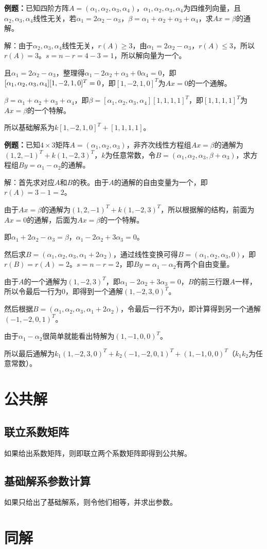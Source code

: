 \documentclass[UTF8, 12pt]{ctexart}
\begin{document}
\textbf{例题：}已知四阶方阵$A=(\alpha_1,\alpha_2,\alpha_3,\alpha_4)$，$\alpha_1,\alpha_2,\alpha_3,\alpha_4$为四维列向量，且$\alpha_2,\alpha_3,\alpha_4$线性无关，若$\alpha_1=2\alpha_2-\alpha_3$，$\beta=\alpha_1+\alpha_2+\alpha_3+\alpha_4$，求$Ax=\beta$的通解。

解：由于$\alpha_2,\alpha_3,\alpha_4$线性无关，$r(A)\geqslant3$，由$\alpha_1=2\alpha_2-\alpha_3$，$r(A)\leqslant3$，所以$r(A)=3$。$s=n-r=4-3=1$，所以解向量为一个。

且$\alpha_1=2\alpha_2-\alpha_3$，整理得$\alpha_1-2\alpha_2+\alpha_3+0\alpha_4=0$，即$[\alpha_1,\alpha_2,\alpha_3,\alpha_4][1,-2,1,0]^T\\=0$，即$[1,-2,1,0]^T$为$Ax=0$的一个通解。

$\beta=\alpha_1+\alpha_2+\alpha_3+\alpha_4$，即$\beta=[\alpha_1,\alpha_2,\alpha_3,\alpha_4][1,1,1,1]^T$，即$[1,1,1,1]^T$为$Ax=\beta$的一个特解。

所以基础解系为$k[1,-2,1,0]^T+[1,1,1,1]$。

\textbf{例题：}已知$4\times3$矩阵$A=(\alpha_1,\alpha_2,\alpha_3)$，非齐次线性方程组$Ax=\beta$的通解为$(1,2,-1)^T+k(1,-2,3)^T$，$k$为任意常数，令$B=(\alpha_1,\alpha_2,\alpha_3,\beta+\alpha_3)$，求方程组$By=\alpha_1-\alpha_2$的通解。

解：首先求对应$A$和$B$的秩。由于$A$的通解的自由变量为一个，即$r(A)=3-1=2$。

由于$Ax=\beta$的通解为$(1,2,-1)^T+k(1,-2,3)^T$，所以根据解的结构，前面为$Ax=0$的通解，后面为$Ax=\beta$的一个特解。

即$\alpha_1+2\alpha_2-\alpha_3=\beta$，$\alpha_1-2\alpha_2+3\alpha_3=0$。

然后求$B=(\alpha_1,\alpha_2,\alpha_3,\alpha_1+2\alpha_2)$，通过线性变换可得$B=(\alpha_1,\alpha_2,\alpha_3,0)$，即$r(B)=r(A)=2$。$s=n-r=2$，即$By=\alpha_1-\alpha_2$有两个自由变量。

由于$A$的一个通解为$(1,-2,3)^T$，即$\alpha_1-2\alpha_2+3\alpha_3=0$，$B$的前三行跟$A$一样，所以令最后一行为0，即得到一个通解$(1,-2,3,0)^T$。

然后根据$B=(\alpha_1,\alpha_2,\alpha_3,\alpha_1+2\alpha_2)$，令最后一行不为0，即计算得到另一个通解$(-1,-2,0,1)^T$。

由于$\alpha_1-\alpha_2$很简单就能看出特解为$(1,-1,0,0)^T$。

所以最后通解为$k_1(1,-2,3,0)^T+k_2(-1,-2,0,1)^T+(1,-1,0,0)^T$（$k_1k_2$为任意常数）。

\section{公共解}

\subsection{联立系数矩阵}

如果给出系数矩阵，则即联立两个系数矩阵即得到公共解。

\subsection{基础解系参数计算}

如果只给出了基础解系，则令他们相等，并求出参数。

\section{同解}
\end{document}
